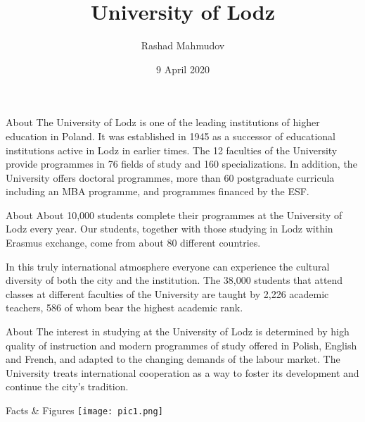\documentclass[hyperref={pdfpagemode=FullScreen}]{beamer}
\title{University of Lodz}
\author{Rashad Mahmudov}
\date{9 April 2020}
\begin{document}
\begin{frame}
\titlepage
\end{frame}

\begin{frame}{About}
  The University of Lodz is one of the leading institutions of higher education in Poland. It was established in 1945 as a successor of educational institutions active in Lodz in earlier times. 
  The 12 faculties of the University provide programmes in 76 fields of study and 160 specializations. In addition, the University offers doctoral programmes, more than 60 postgraduate curricula including an MBA programme, and programmes financed by the ESF.
\end{frame}

\begin{frame}{About}
About 10,000 students complete their programmes at the University of Lodz every year. Our students, together with those studying in Lodz within Erasmus exchange, come from about 80 different countries.

In this truly international atmosphere everyone can experience the cultural diversity of both the city and the institution. The 38,000 students that attend classes at different faculties of the University are taught by 2,226 academic teachers, 586 of whom bear the highest academic rank.
\end{frame}

\begin{frame}{About}
The interest in studying at the University of Lodz is determined by high quality of instruction and modern programmes of study offered in Polish, English and French, and adapted to the changing demands of the labour market. The University treats international cooperation as a way to foster its development and continue the city’s tradition.
\end{frame}

\begin{frame}{Facts \& Figures}
\centering\texttt{[image: pic1.png]}\qquad
\end{frame}
\end{document}

